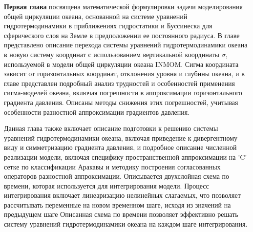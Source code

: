 
\underline{\textbf{Первая глава}} посвящена математической формулировки задачи моделирования общей циркуляции океана, основанной на системе уравнений гидротермодинамики в приближениях гидростатики и Буссинеска для сферического слоя на Земле в предположении ее постоянного радиуса.
В главе представлено описание перехода системы уравнений гидротермодинамики океана в новую систему координат с использованием вертикальной координаты $\sigma$, 
используемой в модели общей циркуляции океана INMOM.
Сигма координата зависит от горизонтальных координат, отклонения уровня и глубины океана, и в главе
представлен подробный анализ трудностей и особенностей применения сигма-моделей океана, включая погрешности в аппроксимации горизонтального градиента давления. Описаны методы снижения этих погрешностей, учитывая особенности разностной аппроксимации градиентов давления.

Данная глава также включает описание подготовки к решению системы уравнений гидротермодинамики океана, включая приведение к дивергентному виду и симметризацию градиента давления, и подробное описание численной реализации модели, включая специфику пространственной аппроксимации на 'C'-сетке по классификации Аракавы и методику построения согласованных операторов разностной аппроксимации.
Описывается двухслойная схема по времени, которая используется для интегрирования модели. Процесс интегрирования включает линеаризацию нелинейных слагаемых, что позволяет рассчитывать переменные на новом временном шаге, исходя из значений на предыдущем шаге
Описанная схема по времени позволяет эффективно решать систему уравнений гидротермодинамики океана на каждом шаге интегрирования.

